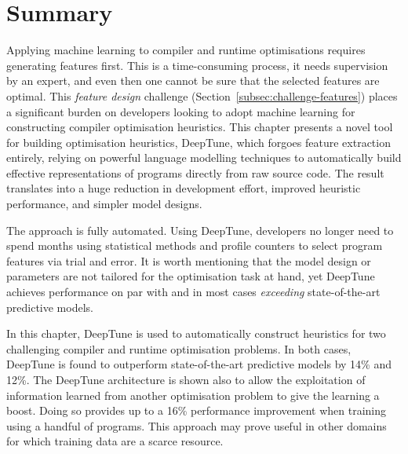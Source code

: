 \section{Summary}
\label{sec:deeptune-conclusion}

Applying machine learning to compiler and runtime optimisations requires generating features first. This is a time-consuming process, it needs supervision by an expert, and even then one cannot be sure that the selected features are optimal. This \emph{feature design} challenge (Section~\ref{subsec:challenge-features}) places a significant burden on developers looking to adopt machine learning for constructing compiler optimisation heuristics. This chapter presents a novel tool for building optimisation heuristics, DeepTune, which forgoes feature extraction entirely, relying on powerful language modelling techniques to automatically build effective representations of programs directly from raw source code. The result translates into a huge reduction in development effort, improved heuristic performance, and simpler model designs.

The approach is fully automated. Using DeepTune, developers no longer need to spend months using statistical methods and profile counters to select program features via trial and error. It is worth mentioning that the model design or parameters are not tailored for the optimisation task at hand, yet DeepTune achieves performance on par with and in most cases \emph{exceeding} state-of-the-art predictive models.

In this chapter, DeepTune is used to automatically construct heuristics for two challenging compiler and runtime optimisation problems. In both cases, DeepTune is found to outperform state-of-the-art predictive models by 14\% and 12\%. The DeepTune architecture is shown also to allow the exploitation of information learned from another optimisation problem to give the learning a boost. Doing so provides up to a 16\% performance improvement when training using a handful of programs. This approach may prove useful in other domains for which training data are a scarce resource.
